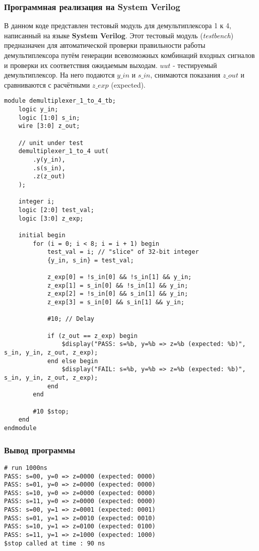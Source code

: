 \subsubsection{Программная реализация на System Verilog}

В данном коде представлен тестовый модуль для демультиплексора 1 к 4, написанный на языке \textbf{System Verilog}. Этот тестовый модуль (\textit{testbench}) предназначен для автоматической проверки правильности работы демультиплексора путём генерации всевозможных комбинаций входных сигналов и проверки их соответствия ожидаемым выходам. $uut$ - тестируемый демультиплексор. На него подаются $y\_in$ и $s\_in$, снимаются показания $z\_out$ и сравниваются с расчётными $z\_exp$ (expected).


\begin{lstlisting}
module demultiplexer_1_to_4_tb;
    logic y_in;
    logic [1:0] s_in;
    wire [3:0] z_out;

    // unit under test
    demultiplexer_1_to_4 uut(
        .y(y_in),
        .s(s_in),
        .z(z_out)
    );

    integer i;
    logic [2:0] test_val;
    logic [3:0] z_exp;

    initial begin
        for (i = 0; i < 8; i = i + 1) begin
            test_val = i; // "slice" of 32-bit integer
            {y_in, s_in} = test_val;

            z_exp[0] = !s_in[0] && !s_in[1] && y_in;
            z_exp[1] = s_in[0] && !s_in[1] && y_in;
            z_exp[2] = !s_in[0] && s_in[1] && y_in;
            z_exp[3] = s_in[0] && s_in[1] && y_in;

            #10; // Delay

            if (z_out == z_exp) begin
                $display("PASS: s=%b, y=%b => z=%b (expected: %b)", s_in, y_in, z_out, z_exp);
            end else begin
                $display("FAIL: s=%b, y=%b => z=%b (expected: %b)", s_in, y_in, z_out, z_exp);
            end
        end

        #10 $stop;
    end
endmodule
\end{lstlisting}

\subsubsection{Вывод программы}

\begin{verbatim}
# run 1000ns
PASS: s=00, y=0 => z=0000 (expected: 0000)
PASS: s=01, y=0 => z=0000 (expected: 0000)
PASS: s=10, y=0 => z=0000 (expected: 0000)
PASS: s=11, y=0 => z=0000 (expected: 0000)
PASS: s=00, y=1 => z=0001 (expected: 0001)
PASS: s=01, y=1 => z=0010 (expected: 0010)
PASS: s=10, y=1 => z=0100 (expected: 0100)
PASS: s=11, y=1 => z=1000 (expected: 1000)
$stop called at time : 90 ns 
\end{verbatim}

